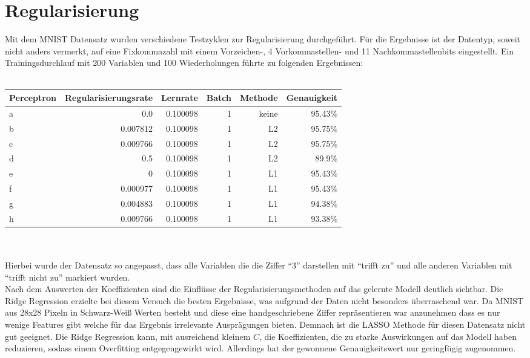 \section{Regularisierung}
Mit dem MNIST Datensatz wurden verschiedene Testzyklen zur Regularisierung durchgeführt. Für die Ergebnisse ist der Datentyp, soweit nicht anders vermerkt, auf eine Fixkommazahl mit einem Vorzeichen-, 4 Vorkommastellen- und 11 Nachkommastellenbits eingestellt. Ein Trainingsdurchlauf mit 200 Variablen und 100 Wiederholungen führte zu folgenden Ergebnissen: \\\\
\begin{tabularx}{\textwidth}{p{}|r|r|r|r|r}
Perceptron & Regularisierungsrate & Lernrate & Batch & Methode & Genauigkeit\\
\hline
a & 0.0 & 0.100098 & 1 & keine & 95.43\%\\
\hline
b & 0.007812 & 0.100098 & 1 & L2 & 95.75\%\\
\hline
c & 0.009766 & 0.100098 & 1 & L2 & 95.75\%\\
\hline
d & 0.5 & 0.100098 & 1 & L2 & 89.9\%\\
\hline
e & 0 & 0.100098 & 1 & L1 & 95.43\%\\
\hline
f & 0.000977 & 0.100098 & 1 & L1 & 95.43\%\\
\hline
g & 0.004883 & 0.100098 & 1 & L1 & 94.38\%\\
\hline
h & 0.009766 & 0.100098 & 1 & L1 & 93.38\%\\
\end{tabularx}\\\\
Hierbei wurde der Datensatz so angepasst, dass alle Variablen die die Ziffer "`3"' darstellen mit "`trifft zu"' und alle anderen Variablen mit "`trifft nicht zu"' markiert wurden.\\
Nach dem Auswerten der Koeffizienten sind die Einflüsse der Regularisierungsmethoden auf das gelernte Modell deutlich sichtbar. Die Ridge Regression erzielte bei diesem Versuch die besten Ergebnisse, was aufgrund der Daten nicht besonders überraschend war. Da MNIST aus 28x28 Pixeln in Schwarz-Weiß Werten besteht und diese eine handgeschriebene Ziffer repräsentieren war anzunehmen dass es nur wenige Features gibt  welche für das Ergebnis irrelevante Ausprägungen bieten. Demnach ist die LASSO Methode für diesen Datensatz nicht gut geeignet. Die Ridge Regression kann, mit ausreichend kleinem $C$, die Koeffizienten, die zu starke Auswirkungen auf das Modell haben reduzieren, sodass einem Overfitting entgegengewirkt wird. Allerdings hat der gewonnene Genauigkeitswert nur geringfügig zugenommen.\\
